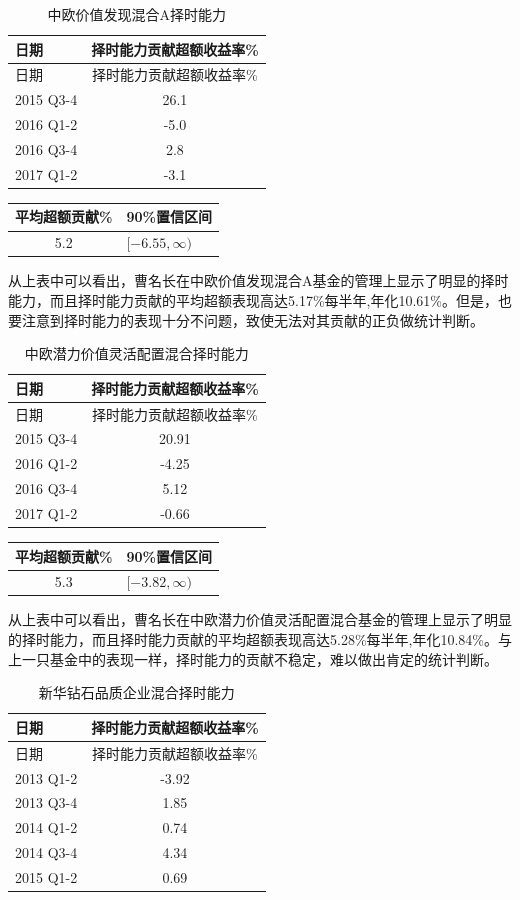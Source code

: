 \documentclass[hyperref,]{ctexart}
\begin{document}
\begin{longtable}[]{@{}lc@{}}
\caption{中欧价值发现混合A择时能力}\tabularnewline
\toprule
日期 & 择时能力贡献超额收益率\%\tabularnewline
\midrule
\endfirsthead
\toprule
日期 & 择时能力贡献超额收益率\%\tabularnewline
\midrule
\endhead
2015 Q3-4 & 26.1\tabularnewline
2016 Q1-2 & -5.0\tabularnewline
2016 Q3-4 & 2.8\tabularnewline
2017 Q1-2 & -3.1\tabularnewline
\bottomrule
\end{longtable}

\begin{longtable}[]{@{}cl@{}}
\toprule
平均超额贡献\% & 90\%置信区间\tabularnewline
\midrule
\endhead
5.2 & \([-6.55,\infty)\)\tabularnewline
\bottomrule
\end{longtable}

从上表中可以看出，曹名长在中欧价值发现混合A基金的管理上显示了明显的择时能力，而且择时能力贡献的平均超额表现高达5.17\%每半年,年化10.61\%。但是，也要注意到择时能力的表现十分不问题，致使无法对其贡献的正负做统计判断。

\begin{longtable}[]{@{}lc@{}}
\caption{中欧潜力价值灵活配置混合择时能力}\tabularnewline
\toprule
日期 & 择时能力贡献超额收益率\%\tabularnewline
\midrule
\endfirsthead
\toprule
日期 & 择时能力贡献超额收益率\%\tabularnewline
\midrule
\endhead
2015 Q3-4 & 20.91\tabularnewline
2016 Q1-2 & -4.25\tabularnewline
2016 Q3-4 & 5.12\tabularnewline
2017 Q1-2 & -0.66\tabularnewline
\bottomrule
\end{longtable}

\begin{longtable}[]{@{}cl@{}}
\toprule
平均超额贡献\% & 90\%置信区间\tabularnewline
\midrule
\endhead
5.3 & \([-3.82,\infty)\)\tabularnewline
\bottomrule
\end{longtable}

从上表中可以看出，曹名长在中欧潜力价值灵活配置混合基金的管理上显示了明显的择时能力，而且择时能力贡献的平均超额表现高达5.28\%每半年,年化10.84\%。与上一只基金中的表现一样，择时能力的贡献不稳定，难以做出肯定的统计判断。

\begin{longtable}[]{@{}lc@{}}
\caption{新华钻石品质企业混合择时能力}\tabularnewline
\toprule
日期 & 择时能力贡献超额收益率\%\tabularnewline
\midrule
\endfirsthead
\toprule
日期 & 择时能力贡献超额收益率\%\tabularnewline
\midrule
\endhead
2013 Q1-2 & -3.92\tabularnewline
2013 Q3-4 & 1.85\tabularnewline
2014 Q1-2 & 0.74\tabularnewline
2014 Q3-4 & 4.34\tabularnewline
2015 Q1-2 & 0.69\tabularnewline
\bottomrule
\end{longtable}
\end{document}

